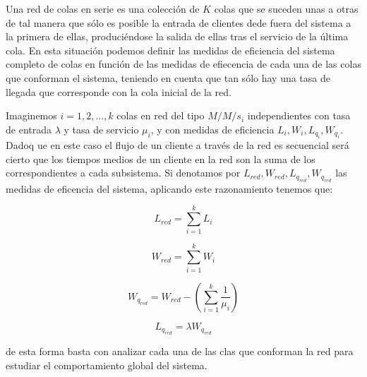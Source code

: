 \documentclass[
]{book}
\theoremstyle{definition}
\theoremstyle{definition}
\theoremstyle{definition}
\theoremstyle{definition}
\theoremstyle{remark}
\begin{document}
Una red de colas en serie es una colección de \(K\) colas que se suceden unas a otras de tal manera que sólo es posible la entrada de clientes dede fuera del sistema a la primera de ellas, produciéndose la salida de ellas tras el servicio de la última cola. En esta situación podemos definir las medidas de eficiencia del sistema completo de colas en función de las medidas de efiecencia de cada una de las colas que conforman el sistema, teniendo en cuenta que tan sólo hay una tasa de llegada que corresponde con la cola inicial de la red.

Imaginemos \(i=1,2,...,k\) colas en red del tipo \(M/M/s_i\) independientes con tasa de entrada \(\lambda\) y tasa de servicio \(\mu_i\), y con medidas de eficiencia \(L_i, W_i, L_{q_i}, W_{q_i}\). Dadoq ue en este caso el flujo de un cliente a través de la red es secuencial será cierto que los tiempos medios de un cliente en la red son la suma de los correspondientes a cada subsistema. Si denotamos por \(L_{red}, W_{red}, L_{q_{red}}, W_{q_{red}}\) las medidas de eficencia del sistema, aplicando este razonamiento tenemos que:

\[L_{red} = \sum_{i = 1}^k L_i\]

\[W_{red} = \sum_{i = 1}^k W_i\]

\[W_{q_{red}} = W_{red} - \left(\sum_{i = 1}^k \frac{1}{\mu_i}\right)\]

\[L_{q_{red}} = \lambda W_{q_{red}}\]

de esta forma basta con analizar cada una de las clas que conforman la red para estudiar el comportamiento global del sistema.
\end{document}
